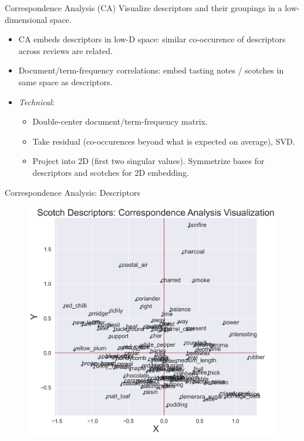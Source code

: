 \documentclass{beamer}
\begin{document}
\begin{frame}{Correspondence Analysis (CA)}
	Visualize descriptors and their groupings in a low-dimensional space.
	\begin{itemize}
		\item CA embeds descriptors in low-D space: similar co-occurence of descriptors across reviews are related.
		\item  Document/term-frequency correlations: embed tasting notes / scotches in same space as descriptors.
		\item \textit{Technical}:
		\begin{itemize} 
			\item Double-center document/term-frequency matrix. 
			\item Take residual (co-occurences beyond what is expected on average), SVD.
			\item Project into 2D (first two singular values). Symmetrize bases for descriptors and scotches for 2D embedding.
			\end{itemize}
	\end{itemize}
\end{frame}
	\begin{frame}{Correspondence Analysis: Descriptors}
	\begin{figure}[H]
		\begin{center}
			\includegraphics[scale = 0.35]{cawordembed}
		\end{center}
	\end{figure}
\end{frame}
\end{document}
